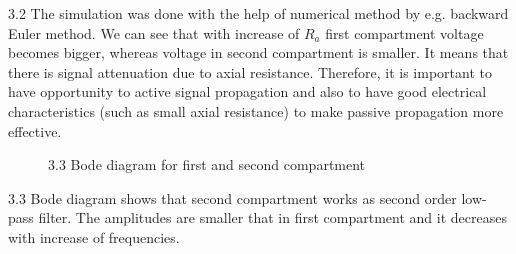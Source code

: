 \documentclass[]{report}
\begin{document}
3.2 The simulation was done with the help of numerical method by e.g. backward Euler method.
We can see that with increase of $R_a$ first compartment voltage becomes bigger, whereas voltage in second compartment is smaller. It means that there is signal attenuation due to axial resistance. Therefore, it is important to have opportunity to active signal propagation and also to have good electrical characteristics (such as small axial resistance) to make passive propagation more effective. 
    \begin{figure}[h!]
    	\centering
    	\hfill
    	\hfill
    	\caption*{3.3 Bode diagram for  first and second compartment }
    \end{figure}


3.3 Bode diagram shows that second compartment works as second order low-pass filter. The amplitudes are smaller that in first compartment and it decreases with increase of frequencies.
 
\end{document}
